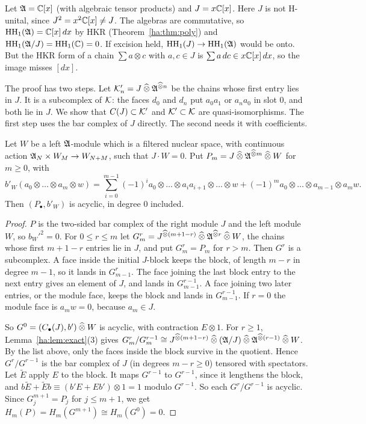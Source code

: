 \begin{example}\label{ha:ex:noexcision}
Let \(\mathfrak A=\mathbb C[x]\) (with algebraic tensor products) and \(J=x\mathbb C[x]\). Here
\(J\) is not H-unital, since \(J^2=x^2\mathbb C[x]\ne J\). The algebras are
commutative, so \(\operatorname{HH}_1(\mathfrak A)=\mathbb C[x]\,dx\) by HKR
(Theorem~\ref{ha:thm:poly}) and \(\operatorname{HH}_1(\mathfrak A/J)=\operatorname{HH}_1(\mathbb C)=0\). If excision
held, \(\operatorname{HH}_1(J)\to\operatorname{HH}_1(\mathfrak A)\) would be onto. But the HKR form of a chain
\(\sum a\otimes c\) with \(a,c\in J\) is \(\sum a\,dc\in x\mathbb C[x]\,dx\), so
the image misses \([dx]\).
\end{example}

The proof has two steps. Let \(\mathcal K'_n=J\mathbin{\widehat\otimes}\mathfrak A^{\mathbin{\widehat\otimes} n}\) be the chains
whose first entry lies in \(J\). It is a subcomplex of \(\mathcal K\): the faces
\(d_0\) and \(d_n\) put \(a_0a_1\) or \(a_na_0\) in slot \(0\), and both
lie in \(J\). We show that \(C(J)\subset\mathcal K'\) and \(\mathcal K'\subset\mathcal K\) are
quasi-isomorphisms. The first step uses the bar complex of \(J\) directly.
The second needs it with coefficients.

\begin{lemma}\label{ha:lem:barW}
Let \(W\) be a left \(\mathfrak A\)-module which is a filtered nuclear space, with
continuous action \(\mathfrak A_N\times W_M\to W_{N+M}\), such that \(J\cdot W=0\).
Put \(P_m=J\mathbin{\widehat\otimes}\mathfrak A^{\mathbin{\widehat\otimes} m}\mathbin{\widehat\otimes} W\) for \(m\ge0\), with
\[
 b'_W(a_0\otimes\dots\otimes a_m\otimes w)=\sum_{i=0}^{m-1}(-1)^i
 a_0\otimes\dots\otimes a_ia_{i+1}\otimes\dots\otimes w+(-1)^m
 a_0\otimes\dots\otimes a_{m-1}\otimes a_mw .
\]
Then \((P_\bullet,b'_W)\) is acyclic, in degree \(0\) included.
\end{lemma}

\begin{proof}
\(P\) is the two-sided bar complex of the right module \(J\) and the left
module \(W\), so \(b_W'^2=0\). For \(0\le r\le m\) let \(G^r_m=J^{\mathbin{\widehat\otimes}(m+1-r)}
\mathbin{\widehat\otimes}\mathfrak A^{\mathbin{\widehat\otimes} r}\mathbin{\widehat\otimes} W\), the chains whose first \(m+1-r\) entries lie in
\(J\), and put \(G^r_m=P_m\) for \(r>m\). Then \(G^r\) is a subcomplex. A
face inside the initial \(J\)-block keeps the block, of length \(m-r\) in
degree \(m-1\), so it lands in \(G^r_{m-1}\). The face joining the last
block entry to the next entry gives an element of \(J\), and lands in
\(G^{r-1}_{m-1}\). A face joining two later entries, or the module face,
keeps the block and lands in \(G^{r-1}_{m-1}\). If \(r=0\) the module face
is \(a_mw=0\), because \(a_m\in J\).

So \(G^0=(C_\bullet(J),b')\mathbin{\widehat\otimes} W\) is acyclic, with contraction
\(E\otimes1\). For \(r\ge1\), Lemma~\ref{ha:lem:exact}(3) gives
\(G^r_m/G^{r-1}_m\cong J^{\mathbin{\widehat\otimes}(m+1-r)}\mathbin{\widehat\otimes}(\mathfrak A/J)\mathbin{\widehat\otimes}\mathfrak A^{\mathbin{\widehat\otimes}(r-1)}\mathbin{\widehat\otimes} W\).
By the list above, only the faces inside the block survive in the
quotient. Hence \(G^r/G^{r-1}\) is the bar complex of \(J\) (in degrees
\(m-r\ge0\)) tensored with spectators. Let \(\tilde E\) apply \(E\) to the
block. It maps \(G^{r-1}\) to \(G^{r-1}\), since it lengthens the block,
and \(b\tilde E+\tilde Eb\equiv(b'E+Eb')\otimes1=1\) modulo \(G^{r-1}\).
So each \(G^r/G^{r-1}\) is acyclic. Since \(G^{m+1}_j=P_j\) for \(j\le
m+1\), we get \(H_m(P)=H_m(G^{m+1})\cong H_m(G^0)=0\).
\end{proof}

